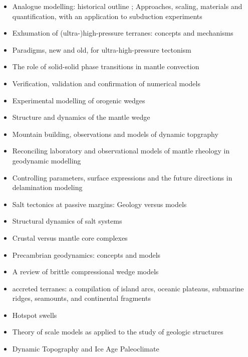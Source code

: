 \begin{itemize}
\item Analogue modelling: historical outline \cite{koyi97}; Approaches, scaling, materials and quantification, with an application to subduction experiments \cite{scst16}
\item Exhumation of (ultra-)high-pressure terranes: concepts and mechanisms \cite{warr13}
\item Paradigms, new and old, for ultra-high-pressure tectonism \cite{hage13}
\item The role of solid-solid phase transitions in mantle convection \cite{fada17}
\item Verification, validation and confirmation of numerical models \cite{orsb94}
\item Experimental modelling of orogenic wedges \cite{grmd12}
\item Structure and dynamics of the mantle wedge \cite{vank03}
\item Mountain building, observations and models of dynamic topgraphy \cite{flgm13,fabc13}
\item Reconciling laboratory and observational models of mantle rheology in geodynamic modelling \cite{king16}
\item Controlling parameters, surface expressions and the future directions in delamination modeling \cite{goue18}
\item Salt tectonics at passive margins: Geology versus models \cite{brfo11}
\item Structural dynamics of salt systems \cite{javs94}
\item Crustal versus mantle core complexes \cite{brst18}
\item Precambrian geodynamics: concepts and models \cite{gery14}
\item A review of brittle compressional wedge models \cite{buit12}
\item accreted terranes: a compilation of island arcs, oceanic
      plateaus, submarine ridges, seamounts, and continental fragments \cite{tebu14}
\item Hotspot swells \cite{kiad14}
\item Theory of scale models as applied to the study of geologic structures \cite{hubb37}
\item Dynamic Topography and Ice Age Paleoclimate \cite{miac20}
\end{itemize}

